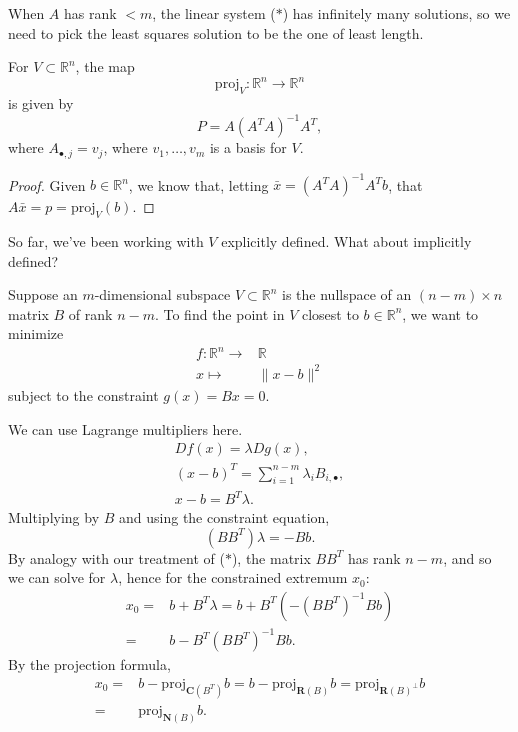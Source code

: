 \documentclass[12pt]{article}
\begin{document}
\begin{remark}
	When $A$ has rank $<m$, the linear system ($\ast$) has infinitely many solutions, so we need to pick the least squares solution to be the one of least length.
\end{remark}

\begin{proposition}
	For $V\subset\mathbb{R}^n$, the map
	\begin{equation*}
		\text{proj}_V:\mathbb{R}^n\to\mathbb{R}^n
	\end{equation*}
	is given by 
	\begin{equation*}
		P = A(A^TA)^{-1}A^T,
	\end{equation*}
	where $A_{\bullet, j}=v_j$, where $v_1,\dots,v_m$ is a basis for $V$.
\end{proposition}
\begin{proof} 
	Given $b\in\mathbb{R}^n$, we know that, letting $\bar{x}=(A^TA)^{-1}A^Tb$, that $A\bar{x}=p=\text{proj}_V(b)$.
\end{proof}	

So far, we've been working with $V$ explicitly defined. What about implicitly defined?

Suppose an $m$-dimensional subspace $V\subset\mathbb{R}^n$ is the nullspace of an $(n-m)\times n$ matrix $B$ of rank $n-m$. To find the point in $V$ closest to $b\in\mathbb{R}^n$, we want to minimize 
\begin{align*}
	f:\mathbb{R}^n \to& \mathbb{R} \\
	x \mapsto& \|x-b\|^2
\end{align*}
subject to the constraint $g(x)=Bx=0$.

We can use Lagrange multipliers here.
\begin{gather*}
	Df(x) = \lambda Dg(x), \\
	(x-b)^T = \sum_{i=1}^{n-m}\lambda_i B_{i,\bullet}, \\
	x-b = B^T\lambda.
\end{gather*}
Multiplying by $B$ and using the constraint equation, 
\begin{equation*}
	(BB^T)\lambda = -Bb.
\end{equation*}
By analogy with our treatment of ($\ast$), the matrix $BB^T$ has rank $n-m$, and so we can solve for $\lambda$, hence for the constrained extremum $x_0$:
\begin{align*}
	x_0 
	=& b + B^T\lambda = b + B^T(-(BB^T)^{-1}Bb) \\
	=& b - B^T(BB^T)^{-1}Bb.
\end{align*}
By the projection formula, 
\begin{align*}
	x_0 
	=& b - \text{proj}_{\mathbf{C}(B^T)}b = b-\text{proj}_{\mathbf{R}(B)}b = \text{proj}_{\mathbf{R}(B)^\perp}b \\
	=& \text{proj}_{\mathbf{N}(B)}b.
\end{align*}
\end{document}
